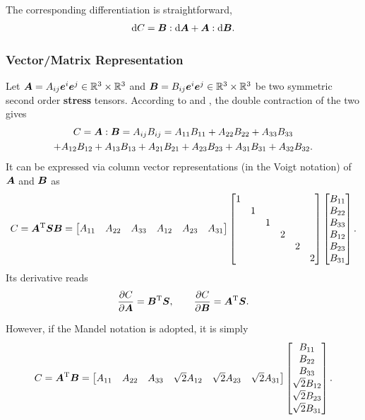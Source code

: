 The corresponding differentiation is straightforward,
\begin{gather}
    \mathrm{d}C=\bm{B}:\mathrm{d}\bm{A}+\bm{A}:\mathrm{d}\bm{B}.
\end{gather}
\subsubsection{Vector/Matrix Representation}
Let $\bm{A}=A_{ij}\bm{e}^i\bm{e}^j\in\mathbb{R}^3\times\mathbb{R}^3$ and $\bm{B}=B_{ij}\bm{e}^i\bm{e}^j\in\mathbb{R}^3\times\mathbb{R}^3$ be two symmetric second order \textbf{stress} tensors. According to  and , the double contraction of the two gives
\begin{multline}
C=\bm{A}:\bm{B}=A_{ij}B_{ij}=A_{11}B_{11}+A_{22}B_{22}+A_{33}B_{33}\\+A_{12}B_{12}+A_{13}B_{13}+A_{21}B_{21}+A_{23}B_{23}+A_{31}B_{31}+A_{32}B_{32}.
\end{multline}
It can be expressed via column vector representations (in the Voigt notation) of $\bm{A}$ and $\bm{B}$ as
\begin{gather}
C=\bm{A}^{\mathrm{T}}\bm{S}\bm{B}=\begin{bmatrix}
A_{11}&A_{22}&A_{33}&A_{12}&A_{23}&A_{31}
\end{bmatrix}
\begin{bmatrix}
1&&&&&\\
&1&&&&\\
&&1&&&\\
&&&2&&\\
&&&&2&\\
&&&&&2
\end{bmatrix}
\begin{bmatrix}
B_{11}\\B_{22}\\B_{33}\\B_{12}\\B_{23}\\B_{31}
\end{bmatrix}.
\end{gather}
Its derivative reads
\begin{gather}
\dfrac{\partial{C}}{\partial{\bm{A}}}=\bm{B}^{\mathrm{T}}\bm{S},\qquad
\dfrac{\partial{C}}{\partial{\bm{B}}}=\bm{A}^{\mathrm{T}}\bm{S}.
\end{gather}

However, if the Mandel notation is adopted, it is simply
\begin{gather}
C=\bm{A}^{\mathrm{T}}\bm{B}=\begin{bmatrix}
A_{11}&A_{22}&A_{33}&\sqrt{2}A_{12}&\sqrt{2}A_{23}&\sqrt{2}A_{31}
\end{bmatrix}
\begin{bmatrix}
B_{11}\\B_{22}\\B_{33}\\\sqrt{2}B_{12}\\\sqrt{2}B_{23}\\\sqrt{2}B_{31}
\end{bmatrix}.
\end{gather}

